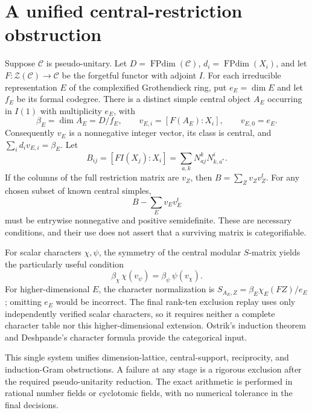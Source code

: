 \documentclass[11pt]{article}
\newcommand{\FPdim}{\operatorname{FPdim}}
\begin{document}
\section{A unified central-restriction obstruction}
Suppose $\mathcal C$ is pseudo-unitary. Let $D=\FPdim(\mathcal C)$,
$d_i=\FPdim(X_i)$, and let $F:\mathcal Z(\mathcal C)\to\mathcal C$ be the
forgetful functor with adjoint $I$. For each irreducible representation $E$
of the complexified Grothendieck ring, put $e_E=\dim E$ and let $f_E$ be its
formal codegree. There is a distinct simple central object $A_E$ occurring
in $I(1)$ with multiplicity $e_E$, with
\[
 \beta_E=\dim A_E=D/f_E,\qquad
 v_{E,i}=[F(A_E):X_i],\qquad v_{E,0}=e_E.
\]
Consequently $v_E$ is a nonnegative integer vector, its class is central,
and $\sum_i d_iv_{E,i}=\beta_E$. Let
\[
 B_{ij}=[F I(X_j):X_i]
       =\sum_{a,k}N_{aj}^{k}N_{k,a^*}^{i}.
\]
If the columns of the full restriction matrix are $v_Z$, then
$B=\sum_Zv_Zv_Z^t$. For any chosen subset of known central simples,
\[
 B-\sum_Ev_Ev_E^t
\]
must be entrywise nonnegative and positive semidefinite. These are necessary
conditions, and their use does not assert that a surviving matrix is
categorifiable.

For scalar characters $\chi,\psi$, the symmetry of the central modular
$S$-matrix yields the particularly useful condition
\[
 \beta_\chi\,\chi(v_\psi)=\beta_\psi\,\psi(v_\chi).
\]
For higher-dimensional $E$, the character normalization is
$S_{A_E,Z}=\beta_E\chi_E(FZ)/e_E$; omitting $e_E$ would be incorrect.
The final rank-ten exclusion replay uses only independently verified scalar
characters, so it requires neither a complete character table nor this
higher-dimensional extension. Ostrik's induction theorem
\cite[Theorem~2.13]{Ostrik3} and Deshpande's character formula
\cite[Equations~(35)--(36)]{Deshpande} provide the categorical input.

This single system unifies dimension-lattice, central-support, reciprocity,
and induction-Gram obstructions. A failure at any stage is a rigorous
exclusion after the required pseudo-unitarity reduction. The exact arithmetic
is performed in rational number fields or cyclotomic fields, with no numerical
tolerance in the final decisions.
\end{document}
